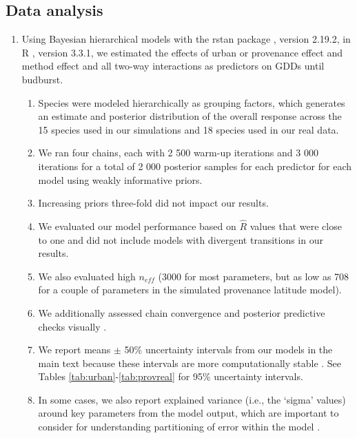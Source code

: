 \documentclass{article}\usepackage[]{graphicx}\usepackage[]{color}
\begin{document}
\subsection*{Data analysis}
\begin{enumerate}
\item Using Bayesian hierarchical models with the rstan package \citep{rstan2019}, version 2.19.2,  in R \citep{R}, version 3.3.1, we estimated the effects of urban or provenance effect and method effect and all two-way interactions as predictors on GDDs until budburst. 
  \begin{enumerate} 
  \item Species were modeled hierarchically as grouping factors, which generates an estimate and posterior distribution of the overall response across the 15 species used in our simulations and 18 species used in our real data.
  \item We ran four chains, each with 2 500 warm-up iterations and 3 000 iterations for a total of 2 000 posterior samples for each predictor for each model using weakly informative priors.
  \item Increasing priors three-fold did not impact our results.
  \item We evaluated our model performance based on $\hat{R}$ values that were close to one and did not include models with divergent transitions in our results. 
  \item We also evaluated high $n_{eff}$ (3000 for most parameters, but as low as 708 for a couple of parameters in the simulated provenance latitude model). 
  \item We additionally assessed chain convergence and posterior predictive checks visually \citep{BDA}.
  \item We report means $\pm$ 50\% uncertainty intervals from our models in the main text because these intervals are more computationally stable \citep{Carpenter2017,BDA}. See Tables \ref{tab:urban}-\ref{tab:provreal} for 95\% uncertainty intervals. 
  \item In some cases, we also report explained variance (i.e., the `sigma' values) around key parameters from the model output, which are important to consider for understanding partitioning of error within the model \citep{BDA}.
  \end{enumerate}
\end{enumerate}
\end{document}
